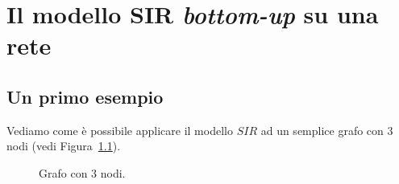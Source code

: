 \chapter{Il modello SIR \textit{bottom-up} su una rete}
\section{Un primo esempio}
Vediamo come \`e possibile applicare il modello $SIR$ ad un semplice grafo con 3 nodi (vedi Figura~\ref{fig::3nodi}).\\
\begin{figure}[h]
\centering
{}	
\caption{Grafo con 3 nodi.}
\label{fig::3nodi}
\end{figure}

